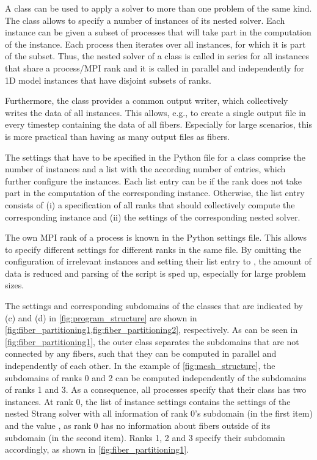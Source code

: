 A  class can be used to apply a solver to more than one problem of the same kind. The class allows to specify a number of instances of its nested solver. Each instance can be given a subset of processes that will take part in the computation of the instance. Each process then iterates over all instances, for which it is part of the subset. Thus, the nested solver of a  class is called in series for all instances that share a process/MPI rank and it is called in parallel and independently for 1D model instances that have disjoint subsets of ranks.

Furthermore, the class provides a common output writer, which collectively writes the data of all instances. This allows, e.g., to create a single output file in every timestep containing the data of all fibers. Especially for large scenarios, this is more practical than having as many output files as fibers.

The settings that have to be specified in the Python file for a  class comprise the number of instances and a list with the according number of entries, which further configure the instances. Each list entry can be  if the rank does not take part in the computation of the corresponding instance. 
Otherwise, the list entry consists of (i) a specification of all ranks that should collectively compute the corresponding instance and (ii) the settings of the corresponding nested solver. 

The own MPI rank of a process is known in the Python settings file. This allows to specify different settings for different ranks in the same file. By omitting the configuration of irrelevant instances and setting their list entry to , the amount of data is reduced and parsing of the script is sped up, especially for large problem sizes.

The settings and corresponding subdomains of the  classes that are indicated by (c) and (d) in \cref{fig:program_structure} are shown in \cref{fig:fiber_partitioning1,fig:fiber_partitioning2}, respectively.
As can be seen in \cref{fig:fiber_partitioning1}, the outer  class separates the subdomains that are not connected by any fibers, such that they can be computed in parallel and independently of each other. In the example of \cref{fig:mesh_structure}, the subdomains of ranks 0 and 2 can be computed independently of the subdomains of ranks 1 and 3. 
As a consequence, all processes specify that their  class has two instances. 
At rank 0, the list of instance settings contains the settings of the nested Strang solver with all information of rank 0's subdomain (in the first item) and the value , as rank 0 has no information about fibers outside of its subdomain (in the second item). Ranks 1, 2 and 3 specify their subdomain accordingly, as shown in \cref{fig:fiber_partitioning1}.

